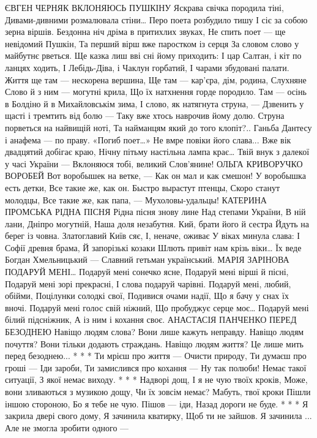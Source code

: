 ЄВГЕН ЧЕРНЯК
ВКЛОНЯЮСЬ ПУШКІНУ
Яскрава свічка породила тіні,
Дивами-дивними розмалювала стіни…
Перо поета розбудило тишу
І сіє за собою зерна віршів.
Бездонна ніч дріма в притихлих звуках,
Не спить поет — ще невідомий Пушкін,
Та перший вірш вже паростком із серця
За словом слово у майбутнє рветься.
Ще казка лиш вві сні йому приходить:
І цар Салтан, і кіт по ланцях ходить,
І Лебідь-Діва, і Чаклун горбатий,
І чарами збудовані палати.
Життя ще там — нескорена вершина,
Ще там — кар’єра, дім, родина,
Слухняне Слово й з ним — могутні крила,
Що їх натхнення горде породило.
Там — осінь в Болдіно й в Михайловськім зима,
І слово, як натягнута струна, —
Дзвенить у щасті і тремтить від болю —
Таку вже хтось наврочив йому долю.
Струна порветься на найвищій ноті,
Та найманцям який до того клопіт?..
Ганьба Дантесу і анафема — по праву.
«Погиб поет…» Не вмре повіки його слава...
Вже вік двадцятий добігає краю,
Нічну пітьму настільна лампа крає…
Твій внук з далекої у часі України —
Вклоняюся тобі, великий Слов’янине!
ОЛЬГА КРИВОРУЧКО
ВОРОБЕЙ
Вот воробышек на ветке, —
Как он мал и как смешон!
У воробышка есть детки,
Все такие же, как он.
Быстро вырастут птенцы,
Скоро станут молодцы,
Все такие же, как папа, —
Мухоловы-удальцы!
КАТЕРИНА ПРОМСЬКА
РІДНА ПІСНЯ
Рідна пісня знову лине
Над степами України,
В ній лани, Дніпро могутній,
Наша доля незабутня.
Кий, брати його й сестра
Йдуть на берег із човна.
Златоглавий Київ сяє,
І, неначе, оживає
У віках минула слава:
І Софії древня брама,
Й запорізькі козаки
Шлють привіт нам крізь віки…
Їх веде Богдан Хмельницький —
Славний гетьман український.
МАРІЯ ЗАРІНОВА
ПОДАРУЙ МЕНІ…
Подаруй мені сонечко ясне,
Подаруй мені вірші й пісні,
Подаруй мені зорі прекрасні,
І слова подаруй чарівні.
Подаруй мені, любий, обійми,
Поцілунки солодкі свої,
Подивися очами надії,
Що я бачу у снах їх вночі.
Подаруй мені голос свій ніжний,
Що пробуджує серце моє…
Подаруй мені білий підсніжник,
А із ним і кохання своє.
АНАСТАСІЯ ПАНЧЕНКО
ПЕРЕД БЕЗОДНЕЮ
Навіщо людям слова?
Вони лише кажуть неправду.
Навіщо людям почуття?
Вони тільки додають страждань.
Навіщо людям життя?
Це лише мить перед безоднею...
* * *
Ти мрієш про життя —
Очисти природу,
Ти думаєш про гроші —
Іди зароби,
Ти замислився про кохання —
Ну так полюби!
Немає такої ситуації,
З якої немає виходу.
* * *
Надворі дощ,
І я не чую твоїх кроків,
Може, вони зливаються з музикою дощу,
Чи їх зовсім немає?
Мабуть, твої кроки
Пішли іншою стороною,
Бо я тебе не чую.
Пішов — іди,
Назад дороги не буде.
* * *
Я закрила двері свого дому,
Я зачинила кватирку,
Щоб ти не зайшов.
Я зачинила ...
Але не змогла зробити одного —
